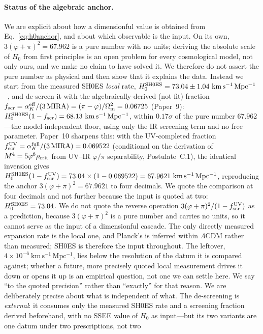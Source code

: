 \documentclass[aps,prd,preprint,amsmath,amssymb,nofootinbib,longbibliography]{revtex4-2}
\newcommand{\kms}{\mathrm{km\,s^{-1}\,Mpc^{-1}}}
\newcommand{\Om}{\Omega_{\mathrm{m}}}
\begin{document}
\paragraph{Status of the algebraic anchor.} We are explicit about how a
dimensionful value is obtained from Eq.~\eqref{eq:h0anchor}, and about which
observable is the input. On its own, $3(\varphi+\pi)^2=67.962$ is a pure
number with no units; deriving the absolute scale of $H_0$ from first
principles is an open problem for every cosmological model, not only ours,
and we make no claim to have solved it. We therefore do not assert the pure
number as physical and then show that it explains the data. Instead we start
from the measured SH0ES \emph{local} rate,
$H_0^{\rm SH0ES}=73.04\pm1.04~\kms$~\citep{Riess2022}, and de-screen it with
the algebraically-derived (not fit) fraction $f_{\rm scr}=\alpha_K^{\rm eff}/(3\,\mathrm{MIRA})=(\pi-\varphi)/\Om^2=0.06725$
(Paper~9): $H_0^{\rm SH0ES}(1-f_{\rm scr})=68.13~\kms$, within $0.17\sigma$ of
the pure number $67.962$---the model-independent floor, using only the IR
screening term and no free parameter. Paper~10 sharpens this: with the
UV-completed fraction $f_{\rm scr}^{\rm UV}=\alpha_K^{\rm full}/(3\,\mathrm{MIRA})=0.069522$
(conditional on the derivation of $M^4=5\varphi^8\rho_{\rm crit}$ from UV--IR
$\varphi/\pi$ separability, Postulate~C.1), the identical inversion gives
$H_0^{\rm SH0ES}(1-f_{\rm scr}^{\rm UV})=73.04\times(1-0.069522)=67.9621~\kms$,
reproducing the anchor $3(\varphi+\pi)^2=67.9621$ to four decimals. We quote the
comparison at four decimals and not further because the input is quoted at two:
$H_0^{\rm SH0ES}=73.04$. We do not quote the reverse operation $3(\varphi+\pi)^2/(1-f_{\rm scr}^{\rm UV})$ as a prediction, because $3(\varphi+\pi)^2$
is a pure number and carries no units, so it cannot serve as the input of a
dimensionful cascade. The only directly measured expansion rate is the local
one, and Planck's is inferred within $\Lambda$CDM rather than measured; SH0ES
is therefore the input throughout. The leftover, $4\times10^{-6}~\kms$, lies below the resolution of
the datum it is compared against; whether a future, more precisely quoted local
measurement drives it down or opens it up is an empirical question, not one we
can settle here. We say ``to the quoted precision'' rather than ``exactly''
for that reason. We are deliberately precise about what is independent of what.
The de-screening is \emph{external}: it consumes only the measured SH0ES rate
and a screening fraction derived beforehand, with no SSEE value of $H_0$ as
input---but its two variants are one datum under two prescriptions, not two
\end{document}
